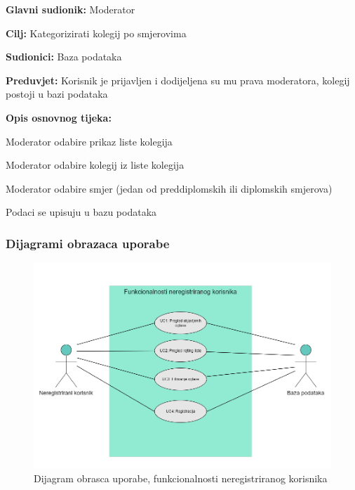 				
					\noindent {}
					\begin{packed_item}
						
						\item \textbf{Glavni sudionik: }Moderator
						\item  \textbf{Cilj:} Kategorizirati kolegij po smjerovima
						\item  \textbf{Sudionici:} Baza podataka
						\item  \textbf{Preduvjet:} Korisnik je prijavljen i dodijeljena su mu prava moderatora, kolegij postoji u bazi podataka
						\item  \textbf{Opis osnovnog tijeka:}
						
						\item[] \begin{packed_enum}
							\item Moderator odabire prikaz liste kolegija
							\item Moderator odabire kolegij iz liste kolegija 
							\item Moderator odabire smjer (jedan od preddiplomskih ili diplomskih smjerova)
							\item Podaci se upisuju u bazu podataka
							
						\end{packed_enum}
						
					\end{packed_item}
				
				\eject
					
				\subsubsection{Dijagrami obrazaca uporabe}
				
					\begin{figure}[H]
						\includegraphics[scale=0.63]{dijagrami/UC_NeregistriranKorisnik.PNG}
						\centering
						\caption{Dijagram obrasca uporabe, funkcionalnosti neregistriranog korisnika}
						\label{fig:UC_NeregistriranKorisnik}
					\end{figure}
				
